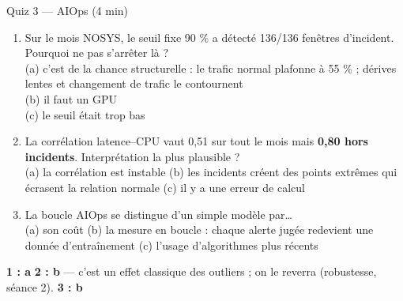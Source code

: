 \begin{frame}{Quiz 3 --- AIOps (4 min)}
\begin{qbox}[3 questions]
\begin{enumerate}
\item Sur le mois NOSYS, le seuil fixe 90 \% a détecté 136/136 fenêtres d'incident.
Pourquoi ne pas s'arrêter là ?\\
(a) c'est de la chance structurelle : le trafic normal plafonne à 55 \% ;
dérives lentes et changement de trafic le contournent\\
(b) il faut un GPU\\ (c) le seuil était trop bas
\item La corrélation latence--CPU vaut 0,51 sur tout le mois mais
\textbf{0,80 hors incidents}. Interprétation la plus plausible ?\\
(a) la corrélation est instable \quad (b) les incidents créent des points
extrêmes qui écrasent la relation normale \quad (c) il y a une erreur de calcul
\item La boucle AIOps se distingue d'un simple modèle par\ldots\\
(a) son coût \quad (b) la mesure en boucle : chaque alerte jugée redevient
une donnée d'entraînement \quad (c) l'usage d'algorithmes plus récents
\end{enumerate}
\end{qbox}
\vspace{1mm}
\begin{solbox}[Réponses]
\textbf{1 : a} \quad \textbf{2 : b} --- c'est un effet classique des outliers ;
on le reverra (robustesse, séance 2). \quad \textbf{3 : b}
\end{solbox}
\end{frame}
